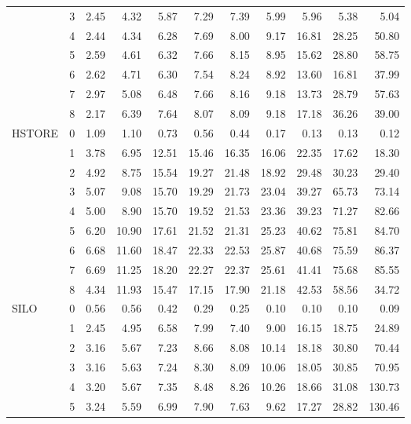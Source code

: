 \begin{tabular}{llrrrrrrrrr}
       & 3 &  2.45 &  4.32 &  5.87 &  7.29 &  7.39 &  5.99 &  5.96 &  5.38 &   5.04 \\
       & 4 &  2.44 &  4.34 &  6.28 &  7.69 &  8.00 &  9.17 & 16.81 & 28.25 &  50.80 \\
       & 5 &  2.59 &  4.61 &  6.32 &  7.66 &  8.15 &  8.95 & 15.62 & 28.80 &  58.75 \\
       & 6 &  2.62 &  4.71 &  6.30 &  7.54 &  8.24 &  8.92 & 13.60 & 16.81 &  37.99 \\
       & 7 &  2.97 &  5.08 &  6.48 &  7.66 &  8.16 &  9.18 & 13.73 & 28.79 &  57.63 \\
       & 8 &  2.17 &  6.39 &  7.64 &  8.07 &  8.09 &  9.18 & 17.18 & 36.26 &  39.00 \\
HSTORE & 0 &  1.09 &  1.10 &  0.73 &  0.56 &  0.44 &  0.17 &  0.13 &  0.13 &   0.12 \\
       & 1 &  3.78 &  6.95 & 12.51 & 15.46 & 16.35 & 16.06 & 22.35 & 17.62 &  18.30 \\
       & 2 &  4.92 &  8.75 & 15.54 & 19.27 & 21.48 & 18.92 & 29.48 & 30.23 &  29.40 \\
       & 3 &  5.07 &  9.08 & 15.70 & 19.29 & 21.73 & 23.04 & 39.27 & 65.73 &  73.14 \\
       & 4 &  5.00 &  8.90 & 15.70 & 19.52 & 21.53 & 23.36 & 39.23 & 71.27 &  82.66 \\
       & 5 &  6.20 & 10.90 & 17.61 & 21.52 & 21.31 & 25.23 & 40.62 & 75.81 &  84.70 \\
       & 6 &  6.68 & 11.60 & 18.47 & 22.33 & 22.53 & 25.87 & 40.68 & 75.59 &  86.37 \\
       & 7 &  6.69 & 11.25 & 18.20 & 22.27 & 22.37 & 25.61 & 41.41 & 75.68 &  85.55 \\
       & 8 &  4.34 & 11.93 & 15.47 & 17.15 & 17.90 & 21.18 & 42.53 & 58.56 &  34.72 \\
SILO & 0 &  0.56 &  0.56 &  0.42 &  0.29 &  0.25 &  0.10 &  0.10 &  0.10 &   0.09 \\
       & 1 &  2.45 &  4.95 &  6.58 &  7.99 &  7.40 &  9.00 & 16.15 & 18.75 &  24.89 \\
       & 2 &  3.16 &  5.67 &  7.23 &  8.66 &  8.08 & 10.14 & 18.18 & 30.80 &  70.44 \\
       & 3 &  3.16 &  5.63 &  7.24 &  8.30 &  8.09 & 10.06 & 18.05 & 30.85 &  70.95 \\
       & 4 &  3.20 &  5.67 &  7.35 &  8.48 &  8.26 & 10.26 & 18.66 & 31.08 & 130.73 \\
       & 5 &  3.24 &  5.59 &  6.99 &  7.90 &  7.63 &  9.62 & 17.27 & 28.82 & 130.46 \\

\end{tabular}
